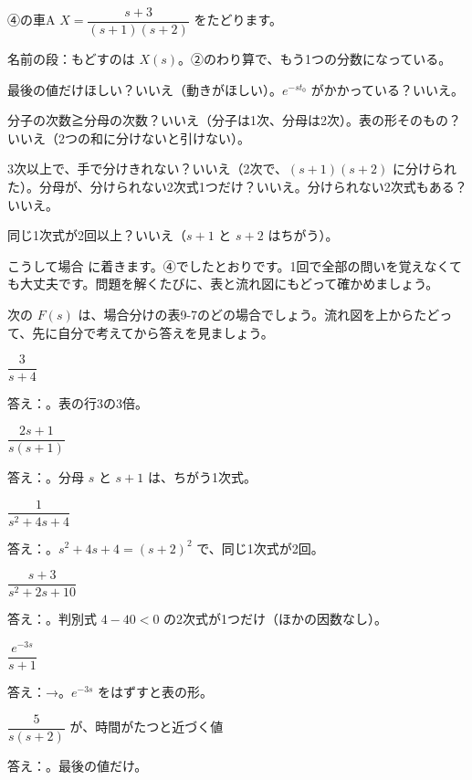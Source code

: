 ④の車A $X=\dfrac{s+3}{(s+1)(s+2)}$ をたどります。
\begin{enumerate}[label={\bkcircled[\bkTT]{\arabic*}}, leftmargin=2.4\zw, itemsep=1pt, topsep=2pt]
\item 名前の段：もどすのは $X(s)$。②のわり算で、もう1つの分数になっている。
\item 最後の値だけほしい？\enspace いいえ（動きがほしい）。\enspace $e^{-st_0}$ がかかっている？\enspace いいえ。
\item 分子の次数≧分母の次数？\enspace いいえ（分子は1次、分母は2次）。\enspace 表の形そのもの？\enspace いいえ（2つの和に分けないと引けない）。
\item 3次以上で、手で分けきれない？\enspace いいえ（2次で、$(s+1)(s+2)$ に分けられた）。\enspace 分母が、分けられない2次式1つだけ？\enspace いいえ。\enspace 分けられない2次式もある？\enspace いいえ。
\item 同じ1次式が2回以上？\enspace いいえ（$s+1$ と $s+2$ はちがう）。
\end{enumerate}
こうして場合  に着きます。④でしたとおりです。1回で全部の問いを覚えなくても大丈夫です。問題を解くたびに、表と流れ図にもどって確かめましょう。

次の $F(s)$ は、場合分けの表9-7のどの場合でしょう。流れ図を上からたどって、先に自分で考えてから答えを見ましょう。
\begin{enumerate}[label={\bkcircled[\bkTT]{\arabic*}}, leftmargin=2.4\zw, itemsep=3pt, topsep=2pt]
\item $\dfrac{3}{s+4}$\par\nobreak\noindent 答え：。表の行3の3倍。
\item $\dfrac{2s+1}{s(s+1)}$\par\nobreak\noindent 答え：。分母 $s$ と $s+1$ は、ちがう1次式。
\item $\dfrac{1}{s^2+4s+4}$\par\nobreak\noindent 答え：。$s^2+4s+4=(s+2)^2$ で、同じ1次式が2回。
\item $\dfrac{s+3}{s^2+2s+10}$\par\nobreak\noindent 答え：。判別式 $4-40<0$ の2次式が1つだけ（ほかの因数なし）。
\item $\dfrac{e^{-3s}}{s+1}$\par\nobreak\noindent 答え：→。$e^{-3s}$ をはずすと表の形。
\item $\dfrac{5}{s(s+2)}$ が、時間がたつと近づく値\par\nobreak\noindent 答え：。最後の値だけ。
\end{enumerate}

